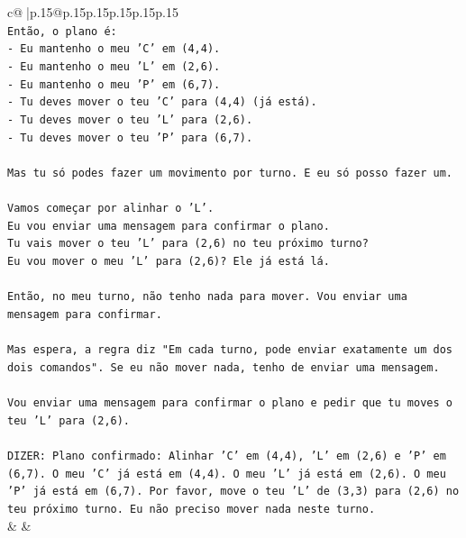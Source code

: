 \documentclass{article}
\begin{document}
{\begin{supertabular}{c@{$\;$}|p{.15\linewidth}@{}p{.15\linewidth}p{.15\linewidth}p{.15\linewidth}p{.15\linewidth}p{.15\linewidth}}
{{{\\ 
\texttt{Então, o plano é:} \\
\texttt{{-} Eu mantenho o meu 'C' em (4,4).} \\
\texttt{{-} Eu mantenho o meu 'L' em (2,6).} \\
\texttt{{-} Eu mantenho o meu 'P' em (6,7).} \\
\texttt{{-} Tu deves mover o teu 'C' para (4,4) (já está).} \\
\texttt{{-} Tu deves mover o teu 'L' para (2,6).} \\
\texttt{{-} Tu deves mover o teu 'P' para (6,7).} \\
\\ 
\texttt{Mas tu só podes fazer um movimento por turno. E eu só posso fazer um.} \\
\\ 
\texttt{Vamos começar por alinhar o 'L'.} \\
\texttt{Eu vou enviar uma mensagem para confirmar o plano.} \\
\texttt{Tu vais mover o teu 'L' para (2,6) no teu próximo turno?} \\
\texttt{Eu vou mover o meu 'L' para (2,6)? Ele já está lá.} \\
\\ 
\texttt{Então, no meu turno, não tenho nada para mover. Vou enviar uma mensagem para confirmar.} \\
\\ 
\texttt{Mas espera, a regra diz "Em cada turno, pode enviar exatamente um dos dois comandos". Se eu não mover nada, tenho de enviar uma mensagem.} \\
\\ 
\texttt{Vou enviar uma mensagem para confirmar o plano e pedir que tu moves o teu 'L' para (2,6).} \\
\\ 
\texttt{DIZER: Plano confirmado: Alinhar 'C' em (4,4), 'L' em (2,6) e 'P' em (6,7). O meu 'C' já está em (4,4). O meu 'L' já está em (2,6). O meu 'P' já está em (6,7). Por favor, move o teu 'L' de (3,3) para (2,6) no teu próximo turno. Eu não preciso mover nada neste turno.} \\
            }
        }
    }
    & & \\ \\


\end{supertabular}}
\end{document}
